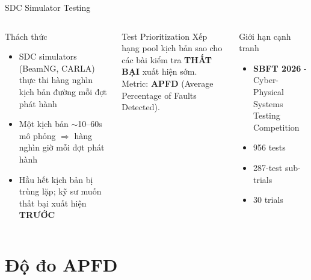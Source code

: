\documentclass[aspectratio=169,10pt]{beamer}
\begin{document}
\begin{frame}{SDC Simulator Testing}
\begin{columns}[T]
\begin{block}{Thách thức}
\scriptsize
\begin{itemize}
  \item SDC simulators (BeamNG, CARLA) thực thi hàng nghìn kịch bản đường mỗi đợt phát hành
  \item Một kịch bản $\sim$10--60s mô phỏng $\Rightarrow$ hàng nghìn giờ mỗi đợt phát hành
  \item Hầu hết kịch bản bị trùng lặp; kỹ sư muốn thất bại xuất hiện \textbf{TRƯỚC}
\end{itemize}
\end{block}

\vspace{0.4em}
\begin{exampleblock}{Test Prioritization}
\scriptsize
Xếp hạng pool kịch bản sao cho các bài kiểm tra \textbf{THẤT BẠI} xuất hiện sớm.\\
Metric: \textbf{APFD} (Average Percentage of Faults Detected).
\end{exampleblock}

\begin{block}{Giới hạn cạnh tranh}
\scriptsize
\begin{itemize}
  \item \textbf{SBFT 2026} - Cyber-Physical Systems Testing Competition
  \item 956 tests
  \item 287-test sub-trials
  \item 30 trials
\end{itemize}
\end{block}
\end{columns}
\end{frame}

\section{Độ đo APFD}
\end{document}
